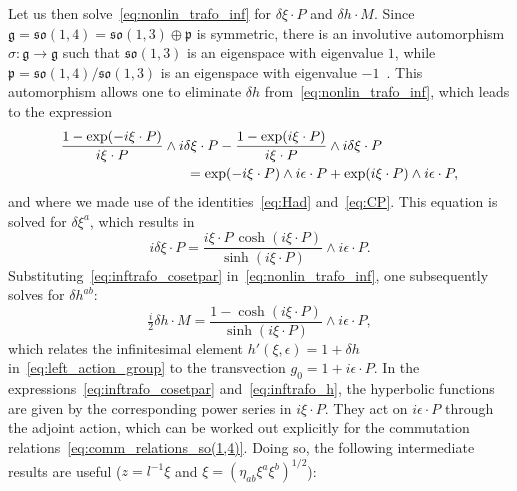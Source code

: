 \documentclass[11pt]{article}
\begin{document}
Let us then solve~\eqref{eq:nonlin_trafo_inf} for $\delta\xi\cdot 
P$ and $\delta h \cdot M$.  Since $\mathfrak{g} = 
\mathfrak{so}(1,4) = \mathfrak{so}(1,3) \oplus \mathfrak{p}$ is 
symmetric, there is an involutive automorphism $\sigma : 
\mathfrak{g} \to \mathfrak{g}$ such that $\mathfrak{so}(1,3)$ is 
an eigenspace with eigenvalue $1$, while $\mathfrak{p} = 
\mathfrak{so}(1,4)/\mathfrak{so}(1,3)$ is an eigenspace with 
eigenvalue $-1$~\cite{kob1996found2}. This automorphism allows 
one to eliminate $\delta h$ from~\eqref{eq:nonlin_trafo_inf}, 
which leads to the expression \begin{displaymath}
\begin{multlined}[b][\linewidth-2\multlinegap]
	\quad\quad
	\frac{1-\exp(-i\xi\cdot P)}{i\xi\cdot P} \wedge 
	i\delta\xi\cdot P - \frac{1-\exp(i\xi\cdot P)}{i\xi\cdot P} 
	\wedge i\delta\xi\cdot P \\
	= \exp(-i\xi\cdot P) \wedge i\epsilon\cdot P + \exp(i\xi\cdot 
	P) \wedge i\epsilon\cdot P,
	\quad\quad
\end{multlined}
\end{displaymath}
and where we made use of the identities~\eqref{eq:Had} 
and~\eqref{eq:CP}. This equation is solved for $\delta \xi^a$, 
which results in
\begin{equation}\label{eq:inftrafo_cosetpar}
	i\delta\xi \cdot P = \frac{i\xi\cdot P\,\cosh(i\xi\cdot 
		P)}{\sinh(i\xi\cdot P)} \wedge i\epsilon\cdot P.
\end{equation}
Substituting~\eqref{eq:inftrafo_cosetpar} 
in~\eqref{eq:nonlin_trafo_inf}, one subsequently solves for 
$\delta h^{ab}$:
\begin{equation}\label{eq:inftrafo_h}
	\tfrac{i}{2}\delta h \cdot M = \frac{1-\cosh(i\xi\cdot 
		P)}{\sinh(i\xi\cdot P)} \wedge i\epsilon\cdot P,
\end{equation}
which relates the infinitesimal element $h'(\xi,\epsilon) = 1 + 
\delta h$ in~\eqref{eq:left_action_group} to the
transvection $g_0 = 1 + i\epsilon\cdot P$. In the 
expressions~\eqref{eq:inftrafo_cosetpar} 
and~\eqref{eq:inftrafo_h}, the hyperbolic functions are given by 
the corresponding power series in $i\xi\cdot P$. They act on 
$i\epsilon\cdot P$ through the adjoint action, which can be 
worked out explicitly for the commutation 
relations~\eqref{eq:comm_relations_so(1,4)}. Doing so, the 
following intermediate results are useful ($z = l^{-1} \xi$ and 
$\xi = (\eta_{ab} \xi^a \xi^b)^{1/2}$):
\end{document}
